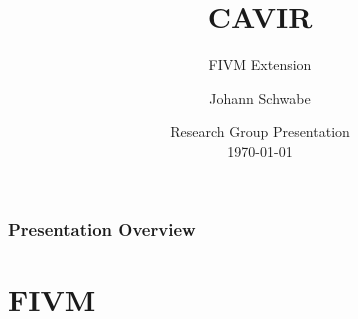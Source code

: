 \documentclass[
	11pt, %
]{beamer}
\title[CAVIR]{CAVIR} %
\subtitle{FIVM Extension} %
\author[Johann Schwabe]{Johann Schwabe} %
\institute[UZH]{University of Zurich\\ \smallskip \textit{johann.schwabe@uzh.ch}} %
\date[\today]{Research Group Presentation \\ \today} %
\begin{document}

\begin{frame}
	\titlepage %
\end{frame}



\begin{frame}
	\frametitle{Presentation Overview} %
	
	\tableofcontents %
\end{frame}


\section{FIVM} %
\end{document}
